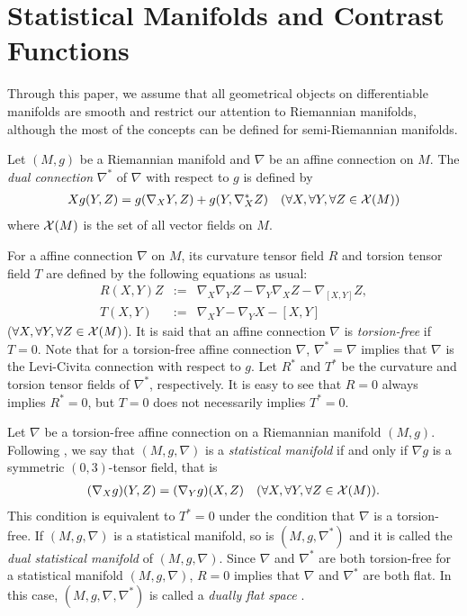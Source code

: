 \documentclass[graybox]{svmult}
\begin{document}
\section{Statistical Manifolds and Contrast Functions}
\label{sec:2}
Through this paper, we assume that all geometrical objects on differentiable manifolds are
smooth and restrict our attention to Riemannian manifolds, although the most of the concepts
can be defined for semi-Riemannian manifolds.

Let $(M,g)$ be a Riemannian manifold and $\nabla$ be an affine connection on $M$. The {\em
dual connection} $\nabla^{\ast}$ of $\nabla$ with respect to $g$ is defined by
%
\begin{eqnarray*}
   Xg(Y,Z) = g(\nabla_{X}Y, Z) + g(Y, \nabla^{\ast}_{X}Z) \ \ \
   (\forall X,\forall Y,\forall Z \in {\cal X}(M))
\end{eqnarray*}
%
where ${\cal X}(M)$ is the set of all vector fields on $M$.

For a affine connection $\nabla$ on $M$, its curvature tensor field $R$ and torsion tensor
field $T$ are defined by the following equations as usual:
%
\begin{eqnarray*}
   R(X,Y)Z &:=& \nabla_{X}\nabla_{Y}Z - \nabla_{Y}\nabla_{X}Z - \nabla_{[X,Y]}Z, \\
   T(X,Y) &:=& \nabla_{X}Y - \nabla_{Y}X - [X,Y]
\end{eqnarray*}
%
($\forall X,\forall Y,\forall Z \in {\cal X}(M)$).
It is said that an affine connection $\nabla$ is {\em torsion-free} if $T=0$.
Note that for a torsion-free affine connection $\nabla$, $\nabla^{\ast}=\nabla$ implies
that $\nabla$ is the Levi-Civita connection with respect to $g$.
Let $R^{\ast}$ and $T^{\ast}$ be the curvature and torsion tensor fields of
$\nabla^{\ast}$, respectively. It is easy to see that $R=0$ always implies $R^{\ast}=0$,
but $T=0$ does not necessarily implies $T^{\ast}=0$.

Let $\nabla$ be a torsion-free affine connection on a Riemannian manifold $(M,g)$.
Following \cite{Ku1},
we say that $(M,g,\nabla)$ is a {\em statistical manifold} if and only if $\nabla g$ is a
symmetric $(0,3)$-tensor field, that is
%
\begin{eqnarray}\label{SM}
   (\nabla_{X}g)(Y,Z) = (\nabla_{Y}g)(X,Z) \ \ \ (\forall X,\forall Y,\forall Z \in {\cal X}(M)).
\end{eqnarray}
%
This condition is equivalent to $T^{\ast}=0$ under the condition that $\nabla$ is a torsion-free.
If $(M,g,\nabla)$ is a statistical manifold, so is $(M,g,\nabla^{\ast})$ and it is called the
{\em dual statistical manifold} of $(M,g,\nabla)$. Since $\nabla$ and $\nabla^{\ast}$ are both
torsion-free for a statistical manifold $(M,g,\nabla)$, $R=0$ implies that
$\nabla$ and $\nabla^{\ast}$ are both flat. In this case, $(M,g,\nabla,\nabla^{\ast})$ is called
a {\em dually flat space} \cite{AN}.
\end{document}
